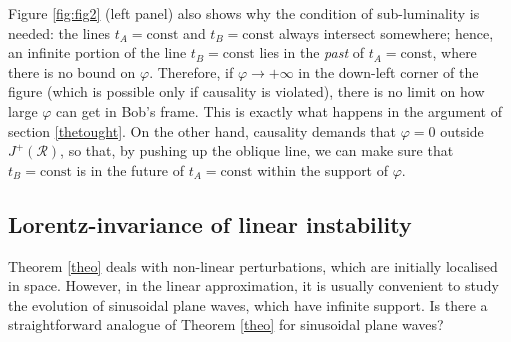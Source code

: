 \documentclass[a4paper, amsfonts, amssymb, amsmath, reprint, showkeys,  twoside, onecolumn,notitlepage,nofootinbib]{revtex4-1}
\theoremstyle{definition}
\theoremstyle{theorem}
\begin{document}
Figure \ref{fig:fig2} (left panel) also shows why the condition of sub-luminality is needed: the lines $t_A=\text{const}$ and $t_B=\text{const}$ always intersect somewhere; hence, an infinite portion of the line $t_B=\text{const}$ lies in the \textit{past} of $t_A=\text{const}$, where there is no bound on $\varphi$. Therefore, if $\varphi \rightarrow +\infty$ in the down-left corner of the figure (which is possible only if causality is violated), there is no limit on how large $\varphi$ can get in Bob's frame. This is exactly what happens in the argument of section \ref{thetought}. On the other hand, causality demands that $\varphi=0$ outside $J^+(\mathcal{R})$, so that, by pushing up the oblique line, we can make sure that $t_B=\text{const}$ is in the future of $t_A=\text{const}$ within the support of $\varphi$.




 















\subsection{Lorentz-invariance of linear instability}\label{SiNNuoz}




Theorem \ref{theo} deals with  non-linear perturbations, which are initially localised in space. However, in the linear approximation, it is usually convenient to study the evolution of sinusoidal plane waves, which have infinite support. Is there a straightforward analogue of Theorem \ref{theo} for sinusoidal plane waves?
\end{document}
